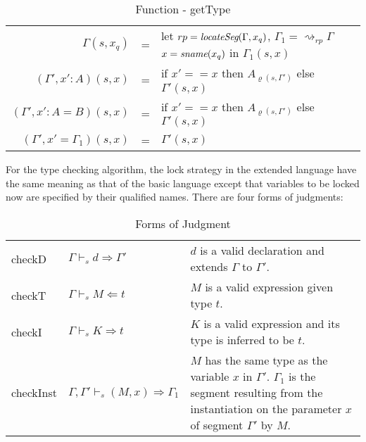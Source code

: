 \begin{table}[h]
  \centering
  \begin{tabular}{r l p{10cm}}
    $\Gamma(s,x_q)$ & = & let $rp = \emph{locateSeg}(\Gamma, x_q)$, $\Gamma_1 = \rightsquigarrow_{rp}\Gamma$ \newline $x = \emph{sname}(x_q)$ in $\Gamma_1(s,x)$ \\
    $(\Gamma', x' : A)(s, x)$ & = & if $x' == x$ then  $A_{\varrho(s, \Gamma')}$ else $\Gamma'(s, x)$ \\
    $(\Gamma', x' : A = B)(s, x)$ & = & if $x' == x$ then  $A_{\varrho(s, \Gamma')}$ else $\Gamma'(s, x)$ \\
    $(\Gamma', x' = \Gamma_1)(s,x)$ & = & $\Gamma'(s,x)$
  \end{tabular}
  \caption{Function - getType}
  \label{extension:tab:getType}
\end{table}

For the type checking algorithm, the lock strategy in the extended language have the same meaning as that of the basic language except that variables to be locked now are specified by their qualified names. There are four forms of judgments:
\begin{table}[h]
  \centering
  \begin{tabular}{l l p{10cm}}
    checkD & $\Gamma \vdash_s d \Rightarrow \Gamma'$ & $d$ is a valid declaration and extends $\Gamma$ to $\Gamma'$. \\
    checkT & $\Gamma \vdash_s M \Leftarrow t$ & $M$ is a valid expression given type $t$. \\
    checkI & $\Gamma \vdash_s K \Rightarrow t$ & $K$ is a valid expression and its type is inferred to be $t$. \\ 
    checkInst & $\Gamma,\Gamma' \vdash_s (M,x) \Rightarrow \Gamma_1$ & $M$ has the same type as the variable $x$ in $\Gamma'$. $\Gamma_1$ is the segment resulting from the instantiation on the parameter $x$ of segment $\Gamma'$ by $M$.
  \end{tabular}
  \caption{Forms of Judgment}
  \label{extension:tab:judgments}
\end{table}

